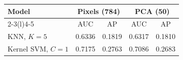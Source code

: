 \begin{tabular}{lcccc}
\toprule
\multirow{2}{*}{Model} & \multicolumn{2}{c}{Pixels (784)} & \multicolumn{2}{c}{PCA (50)} \\
\cmidrule(lr){2-3}\cmidrule(l){4-5}
 & AUC & AP & AUC & AP \\
\midrule
KNN, $K = 5$ & 0.6336 & 0.1819 & 0.6317 & 0.1810 \\
Kernel SVM, $C = 1$ & 0.7175 & 0.2763 & 0.7086 & 0.2683 \\
\bottomrule
\end{tabular}
